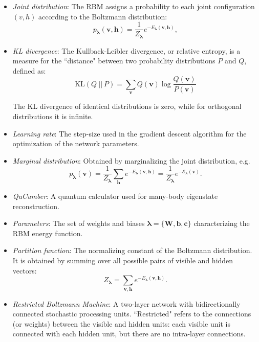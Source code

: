 \documentclass[submission, Phys, hidelnks]{SciPost}
\begin{document}
\begin{itemize}
\item {\it Joint distribution}: The RBM assigns a probability to each joint configuration $(v,h)$ according to the Boltzmann distribution:
\begin{equation}
   p_{\bm{\lambda}}(\bm{v},\bm{h}) = \frac{1}{Z_{\bm{\lambda}}} e^{-E_{\bm{\lambda}}(\bm{v},\bm{h})},
\end{equation}

\item{\it KL divergence}: The Kullback-Leibler divergence, or relative entropy, is a measure for the ``distance" between two probability distributions $P$ and $Q$, defined as:
\begin{equation}
\mathrm{KL}(Q\:||\:P)=\sum_{\bm{v}}Q(\bm{v})\log\frac{Q(\bm{v})}{P(\bm{v})}
\end{equation}


The KL divergence of identical distributions is zero, while for orthogonal distributions it is infinite.

\item{\it Learning rate}: The step-size used in the gradient descent algorithm for the optimization of the network parameters.

\item {\it Marginal distribution}: Obtained by marginalizing the joint distribution, e.g.
\begin{equation}\label{Eq:marginal_distribution}
   p_{\bm{\lambda}}(\bm{v}) = \frac{1}{Z_{\bm{\lambda}}} \sum_{\bm{h}} e^{-E_{\bm{\lambda}}(\bm{v},\bm{h})} = \frac{1}{Z_{\bm{\lambda}}} e^{- \mathcal{E}_{\bm{\lambda}}(\bm{v})}.
\end{equation}

\item {\it QuCumber}: A quantum calculator used for many-body eigenstate reconstruction.

\item {\it Parameters}: The set of weights and biases $\bm{\lambda} = \{\bm{W},\bm{b},\bm{c}\}$ characterizing the RBM energy function. 

\item {\it Partition function}: The normalizing constant of the Boltzmann distribution. It is obtained by summing over all possible pairs of visible and hidden vectors:
\begin{equation}
   Z_{\bm{\lambda}} = \sum\limits_{\bm{v},\bm{h}}e^{-E_{\bm{\lambda}}(\bm{v},\bm{h})}.
\end{equation}

\item {\it Restricted Boltzmann Machine}: A two-layer network with bidirectionally connected stochastic processing units. ``Restricted" refers to the connections (or weights) between the visible and hidden units: each visible unit is connected with each hidden unit, but there are no intra-layer connections.


\end{itemize}
\end{document}
